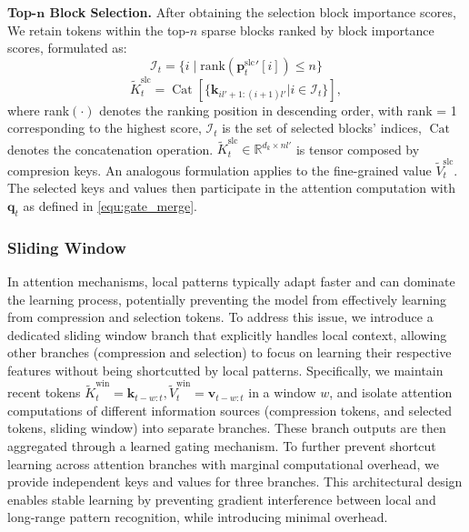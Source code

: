 \textbf{Top-$\pmb{n}$ Block Selection.} After obtaining the selection block importance scores,
We retain tokens within the top-$n$ sparse blocks ranked by block importance scores, formulated as:
\begin{equation}
\mathcal{I}_t = \{i \mid \text{rank}({\mathbf{p}_t^\text{slc}}'[i]) \leq n\}
\end{equation}
\begin{equation}
\tilde{K}^\text{slc}_t =  \operatorname{Cat}\left[\{\mathbf{k}_{il'+1:(i+1)l'}|i \in \mathcal{I}_t\}\right],
\end{equation}
where rank$(\cdot)$ denotes the ranking position in descending order, with rank = 1 corresponding to the highest score, \( \mathcal{I}_t \) is the set of selected blocks' indices,
\( \operatorname{Cat} \) denotes the concatenation operation.
$\tilde{K}_t^\text{slc}\in \mathbb{R}^{ d_k \times nl' }$ is tensor composed by compresion keys. 
An analogous formulation applies to the fine-grained value \( \tilde{V}^\text{slc}_t \).
The selected keys and values then participate in the attention computation with $\mathbf{q}_t$ as defined in \cref{equ:gate_merge}.


\subsubsection{Sliding Window}
In attention mechanisms, local patterns typically adapt faster and can dominate the learning process, potentially preventing the model from effectively learning from compression and selection tokens. To address this issue, we introduce a dedicated sliding window branch that explicitly handles local context, allowing other branches (compression and selection) to focus on learning their respective features without being shortcutted by local patterns. Specifically, we maintain recent tokens $\tilde{K}_t^\text{win}=\mathbf{k}_{t-w:t}, \tilde{V}_t^\text{win}=\mathbf{v}_{t-w:t}$ in a window $w$, and isolate attention computations of different information sources (compression tokens, and selected tokens, sliding window) into separate branches. These branch outputs are then aggregated through a learned gating mechanism. 
To further prevent shortcut learning across attention branches with marginal computational overhead, we provide independent keys and values for three branches.
This architectural design enables stable learning by preventing gradient interference between local and long-range pattern recognition, while introducing minimal overhead.



